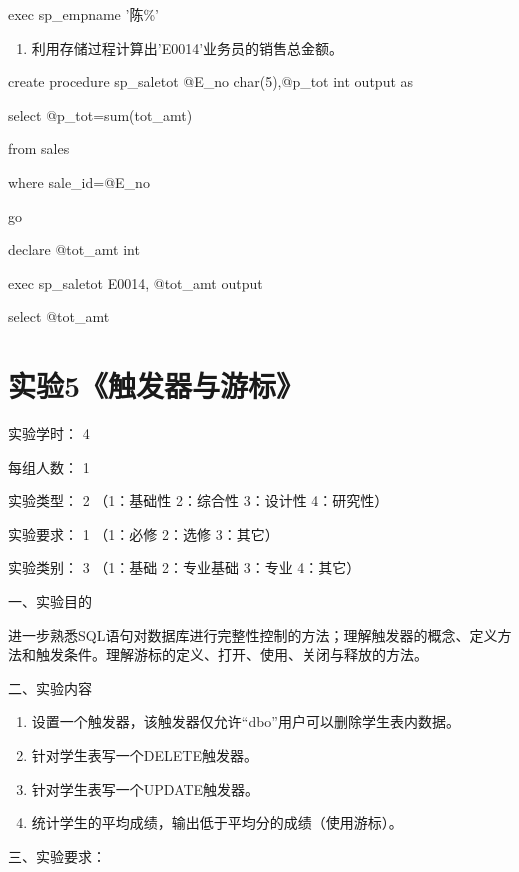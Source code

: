 \documentclass[
]{article}
\begin{document}
exec sp\_empname '陈\%'

\begin{enumerate}
\def\labelenumi{\arabic{enumi}.}
\setcounter{enumi}{1}
\item
  利用存储过程计算出'E0014'业务员的销售总金额。
\end{enumerate}

create procedure sp\_saletot @E\_no char(5),@p\_tot int output as

select @p\_tot=sum(tot\_amt)

from sales

where sale\_id=@E\_no

go

declare @tot\_amt int

exec sp\_saletot E0014, @tot\_amt output

select @tot\_amt

\hypertarget{ux5b9eux9a8c5ux89e6ux53d1ux5668ux4e0eux6e38ux6807}{%
\section{实验5《触发器与游标》}\label{ux5b9eux9a8c5ux89e6ux53d1ux5668ux4e0eux6e38ux6807}}

实验学时： { 4}

每组人数： { 1}

实验类型： { 2} （1：基础性 2：综合性 3：设计性 4：研究性）

实验要求： { 1} （1：必修 2：选修 3：其它）

实验类别： { 3} （1：基础 2：专业基础 3：专业 4：其它）

{}

一、实验目的

进一步熟悉SQL语句对数据库进行完整性控制的方法；理解触发器的概念、定义方法和触发条件。理解游标的定义、打开、使用、关闭与释放的方法。

二、实验内容

\begin{enumerate}
\def\labelenumi{\arabic{enumi}.}
\item
  设置一个触发器，该触发器仅允许``dbo''用户可以删除学生表内数据。
\item
  针对学生表写一个DELETE触发器。
\item
  针对学生表写一个UPDATE触发器。
\item
  统计学生的平均成绩，输出低于平均分的成绩（使用游标）。
\end{enumerate}

三、实验要求：
\end{document}
